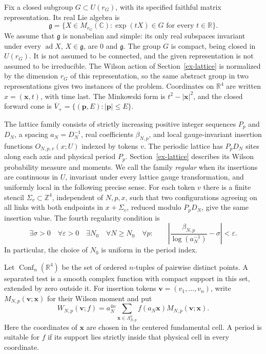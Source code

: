 Fix a closed subgroup \(G\subset U(r_G)\), with its specified faithful matrix
representation. Its real Lie algebra is
\[
 \mathfrak g=\{X\in M_{r_G}(\mathbb C):\exp(tX)\in G
                       \text{ for every }t\in\mathbb R\}.
\]
We assume that \(\mathfrak g\) is nonabelian and simple: its only real
subspaces invariant under every \(\operatorname{ad}X\), \(X\in\mathfrak g\),
are \(0\) and \(\mathfrak g\). The group \(G\) is compact, being closed in
\(U(r_G)\). It is not assumed to be connected, and the given representation
is not assumed to be irreducible. The Wilson action of
Section~\ref{ex-lattice} is normalized by the dimension \(r_G\) of this
representation, so the same abstract group in two representations gives two
instances of the problem. Coordinates on \(\mathbb R^4\) are written
\(x=(\boldsymbol x,t)\), with time last. The Minkowski form is
\(t^2-|\boldsymbol x|^2\), and the closed forward cone is
\(\overline V_+=\{(\boldsymbol p,E):|\boldsymbol p|\le E\}\).

The lattice family consists of strictly increasing positive integer sequences
\(P_p\) and \(D_N\), a spacing \(a_N=D_N^{-1}\), real coefficients
\(\beta_{N,p}\), and local gauge-invariant insertion functions
\(O_{N,p,v}(x;U)\) indexed by tokens \(v\). The periodic lattice has
\(P_pD_N\) sites along each axis and physical period \(P_p\).
Section~\ref{ex-lattice} describes its Wilson probability measure and moments.
We call the family \emph{regular} when its insertions are continuous in
\(U\), invariant under every lattice gauge transformation, and uniformly
local in the following precise sense. For each token \(v\) there is a finite
stencil \(\Sigma_v\subset\mathbb Z^4\), independent of \(N,p,x\), such
that two configurations agreeing on all links with both endpoints in
\(x+\Sigma_v\), reduced modulo \(P_pD_N\), give the same insertion value.
The fourth regularity condition is
\begin{equation}\label{ex-running-input}
 \exists\sigma>0\quad\forall\varepsilon>0\quad\exists N_0\quad
 \forall N\ge N_0\quad\forall p:\qquad
 \left|\frac{\beta_{N,p}}{\log(a_N^{-1})}-\sigma\right|<\varepsilon.
\end{equation}
In particular, the choice of \(N_0\) is uniform in the period index.

Let \(\operatorname{Conf}_n(\mathbb R^4)\) be the set of ordered
\(n\)-tuples of pairwise distinct points. A separated test is a smooth
complex function with compact support in this set, extended by zero outside
it. For insertion tokens \(\boldsymbol v=(v_1,\ldots,v_n)\), write
\(M_{N,p}(\boldsymbol v;\boldsymbol x)\) for their Wilson moment and put
\begin{equation}\label{ex-smearing}
 W_{N,p}(\boldsymbol v;f)=a_N^{4n}
 \sum_{\boldsymbol x\in\Lambda_{N,p}^n}
 f(a_N\boldsymbol x)M_{N,p}(\boldsymbol v;\boldsymbol x).
\end{equation}
Here the coordinates of \(\boldsymbol x\) are chosen in the centered
fundamental cell. A period is suitable for \(f\) if its support lies strictly
inside that physical cell in every coordinate.


